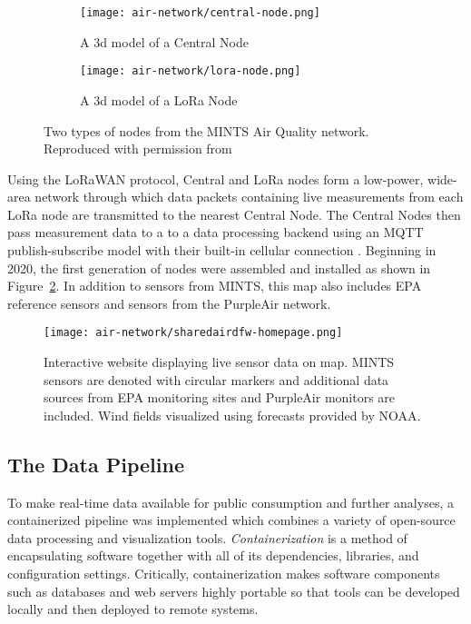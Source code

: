 \begin{figure}[!hbt]
  \begin{subfigure}{.5\textwidth}
    \centering
    \texttt{[image: air-network/central-node.png]}
    \caption{A 3d model of a Central Node}
  \end{subfigure}
  \begin{subfigure}{.5\textwidth}
    \centering
    \texttt{[image: air-network/lora-node.png]}
    \caption{A 3d model of a LoRa Node}
  \end{subfigure}
  \caption{Two types of nodes from the MINTS Air Quality network. Reproduced
    with permission from \cite{lakitha-thesis}}
  \label{fig:mints-nodes}
\end{figure}

Using the LoRaWAN protocol, Central and LoRa nodes form a low-power, wide-area
network through which data packets containing live measurements from each
LoRa node are transmitted to the nearest Central Node. The Central Nodes then
pass measurement data to a to a data processing backend using an MQTT
publish-subscribe model with their built-in cellular connection \cite{mqtt}.
Beginning in 2020, the first generation of nodes were assembled and installed as
shown in Figure~\ref{fig:sharedair-site}. In addition to sensors from MINTS, this
map also includes EPA reference sensors and sensors from the PurpleAir network.
\begin{figure}[!hbt]
  \centering
  \texttt{[image: air-network/sharedairdfw-homepage.png]}
  \caption{Interactive website displaying live sensor data on map. MINTS sensors
  are denoted with circular markers and additional data sources from EPA
  monitoring sites and PurpleAir monitors are included. Wind fields visualized
  using forecasts provided by NOAA.}
  \label{fig:sharedair-site}
\end{figure}


\subsection{The Data Pipeline}

To make real-time data available for public consumption and further analyses, a
containerized pipeline was implemented which combines a variety of open-source
data processing and visualization tools. \textit{Containerization} is a
method of encapsulating software together with
all of its dependencies, libraries, and configuration settings. Critically,
containerization makes software components such as databases and web servers
highly portable so that tools can be developed locally and then deployed to
remote systems.

